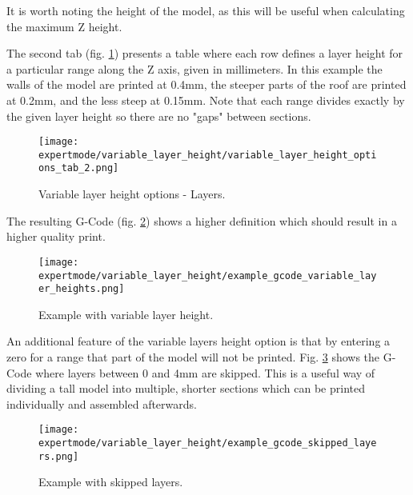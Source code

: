 It is worth noting the height of the model, as this will be useful when calculating the maximum Z height.

The second tab (fig. \ref{fig:variable_layer_height_options_tab_2}) presents a table where each row defines a layer height for a particular range along the Z axis, given in millimeters.  In this example the walls of the model are printed at 0.4mm, the steeper parts of the roof are printed at 0.2mm, and the less steep at 0.15mm.  Note that each range divides exactly by the given layer height so there are no "gaps" between sections.

\begin{figure}[H]
\centering
\texttt{[image: expertmode/variable\_layer\_height/variable\_layer\_height\_options\_tab\_2.png]}
\caption{Variable layer height options - Layers.}
\label{fig:variable_layer_height_options_tab_2}
\end{figure}

The resulting G-Code (fig. \ref{fig:example_gcode_variable_layer_heights}) shows a higher definition which should result in a higher quality print.


\begin{figure}[H]
\centering
\texttt{[image: expertmode/variable\_layer\_height/example\_gcode\_variable\_layer\_heights.png]}
\caption{Example with variable layer height.}
\label{fig:example_gcode_variable_layer_heights}
\end{figure}


An additional feature of the variable layers height option is that by entering a zero for a range that part of the model will not be printed.  Fig. \ref{fig:example_gcode_skipped_layers} shows the G-Code where layers between 0 and 4mm are skipped.  This is a useful way of dividing a tall model into multiple, shorter sections which can be printed individually and assembled afterwards.
\begin{figure}[H]
\centering
\texttt{[image: expertmode/variable\_layer\_height/example\_gcode\_skipped\_layers.png]}
\caption{Example with skipped layers.}
\label{fig:example_gcode_skipped_layers}
\end{figure}

